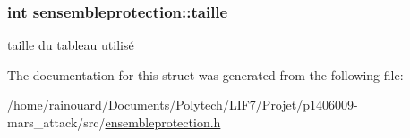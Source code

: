 \subsubsection[{\texorpdfstring{taille}{taille}}]{\setlength{\rightskip}{0pt plus 5cm}int sensembleprotection\+::taille}\hypertarget{structsensembleprotection_ad1d2447259e1f0db56de3ef12199e049}{}\label{structsensembleprotection_ad1d2447259e1f0db56de3ef12199e049}
taille du tableau utilisé 

The documentation for this struct was generated from the following file\+:\begin{DoxyCompactItemize}
\item 
/home/rainouard/\+Documents/\+Polytech/\+L\+I\+F7/\+Projet/p1406009-\/mars\+\_\+attack/src/\hyperlink{ensembleprotection_8h}{ensembleprotection.\+h}\end{DoxyCompactItemize}
